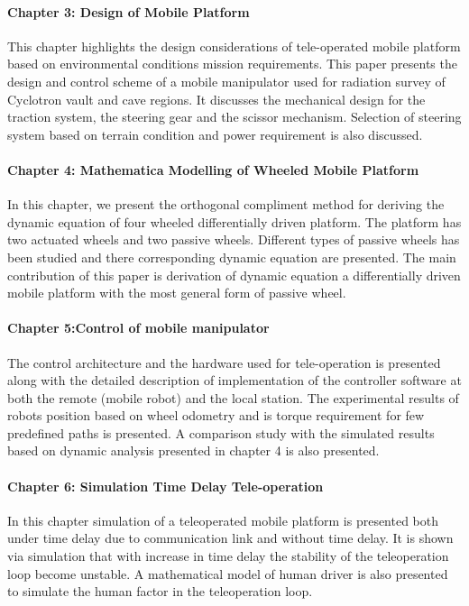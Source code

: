 \paragraph*{Chapter 3: Design of Mobile Platform\\}
This chapter highlights the design considerations of tele-operated mobile platform based on environmental conditions mission requirements. This paper presents the design and control scheme of a mobile manipulator used for radiation survey of Cyclotron vault and cave regions. It discusses the mechanical design for the traction system, the steering gear and the scissor mechanism. Selection of  steering system based on terrain condition and power requirement is also discussed.   
\paragraph*{Chapter 4: Mathematica Modelling of Wheeled Mobile Platform \\}
In this chapter, we present the orthogonal compliment method for deriving the dynamic equation of four wheeled differentially driven platform. The platform has two actuated wheels and two passive wheels. Different types of passive wheels has been studied and there corresponding dynamic equation are presented. The main contribution of this paper is derivation of dynamic equation a differentially driven  mobile platform with the most general form of passive wheel.
\paragraph*{Chapter 5:Control of mobile manipulator \\}
The control architecture and the hardware used for tele-operation is presented along with the detailed description of implementation of the controller software at both the remote (mobile robot)  and the local station. The experimental results of robots position based on wheel odometry and is torque requirement for few predefined paths is presented. A comparison study  with the simulated results based on dynamic analysis presented in chapter 4 is also presented.  
\paragraph*{Chapter 6: Simulation Time Delay Tele-operation \\}

In this chapter simulation of a teleoperated mobile platform is presented both under time delay due to communication link and without time delay. It is shown via simulation that with increase in time delay the stability of the teleoperation loop become unstable. A mathematical model of human driver is also presented to simulate the human factor in the teleoperation loop.
 
